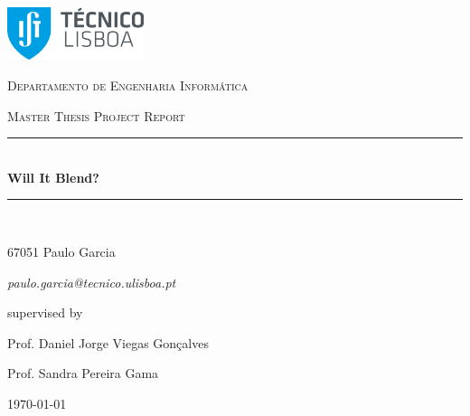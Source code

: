 \documentclass{report}
\newcommand{\HRule}{\rule{\linewidth}{0.5mm}} %
\begin{document}
\begin{titlepage}
	\centering
	\includegraphics[width=0.3\textwidth]{tecnico.png}\par\vspace{1cm}
	{\scshape\LARGE Departamento de Engenharia Informática \par}
	\vspace{1cm}
	{\scshape\Large Master Thesis Project Report\par}
	\vspace{1.5cm}
\HRule \\[0.4cm]
{ \huge \bfseries Will It Blend?}\\[0.4cm] %
\HRule \\[1.5cm]
	\vspace{2cm}
	{\Large 67051 Paulo Garcia\par
    \itshape paulo.garcia@tecnico.ulisboa.pt\par}
	\vfill
	supervised by\par
	Prof. Daniel Jorge Viegas Gonçalves \par
    Prof. Sandra Pereira Gama
	\vfill

	{\large \today\par}
\end{titlepage}

\clearpage
{}

    \tableofcontents
    \listoffigures

\begin{abstract}
Using color to convey information is not a recent rule: its usage is further associated to cartography, statistics and computer science. However, color is a subjective aspect of human perception, as it is strongly influenced by cultural background, childhood learning and possible existent color deficiencies. Over the last years, research has been made to ascertain if color is the ideal channel to transmit information; particularly, if the blending of two or more colors can reveal the true information lying within, using color blending techniques. \\
Nonetheless, previous investigation has not come to an agreement about to which extent can color blending techniques be used, in an efficient and effective way, to convey information. \\
Our goal is to study how color blending can be used to convey information in the best possible way creating, as product of this thesis, a set of rule-of-thumb guidelines to use color blending; we intend to study how color is influenced by its whereabouts, by the cultural background of each user, and if color perception is narrowed by the usage of nominal colors. \\
To achieve the aforementioned results of this thesis, we will not only create a Color Tuner which does not influence the color perception, but also a test framework which will be capable of handling multiple forms of study (\emph{i.e.} online, laboratory and crowdsourced).
\end{abstract}
%
\setcounter{page}{1}
\end{document}

